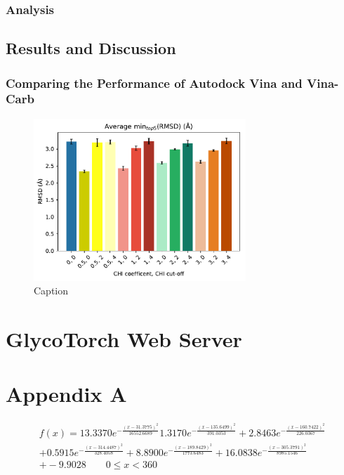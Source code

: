 \documentclass[a4paper, 12pt, openany]{book}
\begin{document}
\subsection{Analysis}
\section{Results and Discussion}

\subsection{Comparing the Performance of Autodock Vina and Vina-Carb}


\begin{figure}
    \centering
    \includegraphics[width=8cm]{Figures/Docking/chairs_RMSD.pdf}
    \caption{Caption}
    \label{fig:my_label}
\end{figure}

\chapter{GlycoTorch Web Server}



\newpage
{}
\printbibliography

\newpage
\chapter{Appendix A}
\vspace{1cm}

\begin{multline}
f(x) = 13.3370e^{-\frac{(x-31.3775)^{2} } { 16552.6689 } }
1.3170e^{-\frac{(x-135.6499)^{2} } { 391.0353 } } +
2.8463e^{-\frac{(x-160.7422)^{2} } { 226.0367 } } \\ +
0.5915e^{-\frac{(x-314.4487)^{2} } { 328.4058 } }  +
8.8900e^{-\frac{(x-189.8429)^{2} } { 1773.6483 } } +
16.0838e^{-\frac{(x-305.3791)^{2} } { 8985.1546 } } \\ + -9.9028
\quad \quad 0 \leq x < 360
\end{multline}

\end{document}
